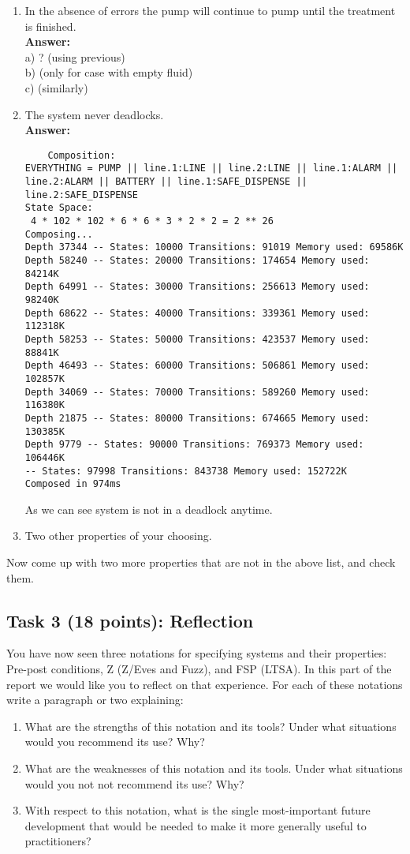 \documentclass{article}
\newcommand{\head}{\subsection*}
\begin{document}
\begin{enumerate}
    \item In the absence of errors the pump will continue to pump until the
treatment is finished.
\\
    \textbf{Answer:}\\
a) ? (using previous)\\
b) (only for case with empty fluid)\\
c) (similarly)
    \item The system never deadlocks.\\
    \textbf{Answer:}
    \begin{verbatim}
    Composition:
EVERYTHING = PUMP || line.1:LINE || line.2:LINE || line.1:ALARM || line.2:ALARM || BATTERY || line.1:SAFE_DISPENSE || line.2:SAFE_DISPENSE
State Space:
 4 * 102 * 102 * 6 * 6 * 3 * 2 * 2 = 2 ** 26
Composing...
Depth 37344 -- States: 10000 Transitions: 91019 Memory used: 69586K
Depth 58240 -- States: 20000 Transitions: 174654 Memory used: 84214K
Depth 64991 -- States: 30000 Transitions: 256613 Memory used: 98240K
Depth 68622 -- States: 40000 Transitions: 339361 Memory used: 112318K
Depth 58253 -- States: 50000 Transitions: 423537 Memory used: 88841K
Depth 46493 -- States: 60000 Transitions: 506861 Memory used: 102857K
Depth 34069 -- States: 70000 Transitions: 589260 Memory used: 116380K
Depth 21875 -- States: 80000 Transitions: 674665 Memory used: 130385K
Depth 9779 -- States: 90000 Transitions: 769373 Memory used: 106446K
-- States: 97998 Transitions: 843738 Memory used: 152722K
Composed in 974ms
    \end{verbatim}
    As we can see system is not in a deadlock anytime.
    \item Two other properties of your choosing.
\end{enumerate}

Now come up with two more properties that are not in the above list, and check them.
\head{Task 3 (18 points): Reflection}

 You have now seen three notations for specifying systems and their properties: Pre-post conditions,
 Z (Z/Eves and Fuzz), and FSP (LTSA).  In this part of the report we would like you to reflect on that experience.
 For each of these notations write a paragraph or two explaining:
\begin{enumerate}
 \item What are the strengths of this notation and its tools?  Under what situations would you
recommend its use? Why?
 \item What are the weaknesses of this notation and its tools. Under what
situations would you not not recommend its use? Why?
 \item With respect to this notation, what is
the single most-important future development that would be needed to make it more generally useful
to practitioners?

\end{enumerate}
\end{document}
